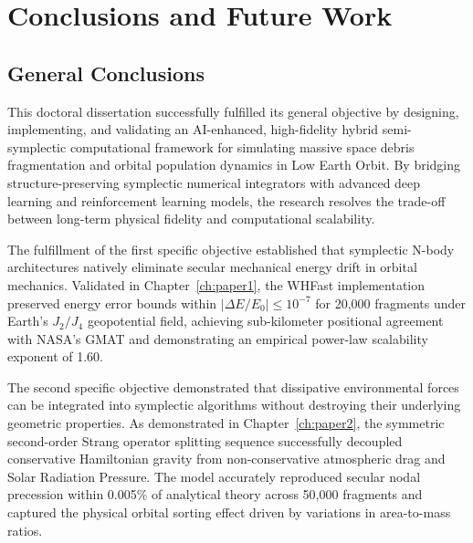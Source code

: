 \documentclass[12pt,letterpaper,twoside]{book}
\begin{document}
\newpage
% 

\cleardoublepage

\chapter{Conclusions and Future Work}
\label{ch:conclusions}

\section{General Conclusions}
This doctoral dissertation successfully fulfilled its general objective by designing, implementing, and validating an AI-enhanced, high-fidelity hybrid semi-symplectic computational framework for simulating massive space debris fragmentation and orbital population dynamics in Low Earth Orbit. By bridging structure-preserving symplectic numerical integrators with advanced deep learning and reinforcement learning models, the research resolves the trade-off between long-term physical fidelity and computational scalability.

The fulfillment of the first specific objective established that symplectic N-body architectures natively eliminate secular mechanical energy drift in orbital mechanics. Validated in Chapter~\ref{ch:paper1}, the WHFast implementation preserved energy error bounds within $\vert{}\Delta E/E_0\vert{} \le 10^{-7}$ for 20,000 fragments under Earth's $J_2/J_4$ geopotential field, achieving sub-kilometer positional agreement with NASA's GMAT and demonstrating an empirical power-law scalability exponent of 1.60.

The second specific objective demonstrated that dissipative environmental forces can be integrated into symplectic algorithms without destroying their underlying geometric properties. As demonstrated in Chapter~\ref{ch:paper2}, the symmetric second-order Strang operator splitting sequence successfully decoupled conservative Hamiltonian gravity from non-conservative atmospheric drag and Solar Radiation Pressure. The model accurately reproduced secular nodal precession within 0.005\% of analytical theory across 50,000 fragments and captured the physical orbital sorting effect driven by variations in area-to-mass ratios.
\end{document}
